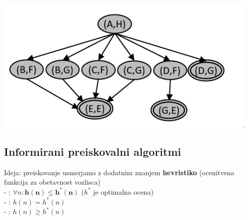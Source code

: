 \includegraphics[width=\columnwidth]{images/dvosmerno-iskanje.png}

\subsection{Informirani preiskovalni algoritmi}
Ideja: preiskovanje usmerjamo z dodatnim znanjem \textbf{hevristiko} (ocenitvena funkcija za obetavnost vozlisca)\\
- : $\forall n: \bm{h(n) \leq h^*(n)}$ ($h^*$ je optimalna ocena)\\
- : $h(n) = h^*(n)$\\
- : $h(n) \geq h^*(n)$

